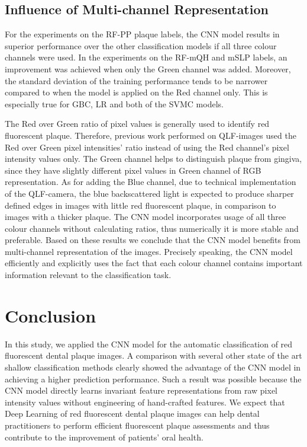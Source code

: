 \documentclass[runningheads,a4paper]{llncs}
\begin{document}
\subsection{Influence of Multi-channel Representation}
For the experiments on the RF-PP plaque labels, the CNN model results in superior performance over the other classification models if all three colour channels were used. In the experiments on the RF-mQH and mSLP labels, an improvement was achieved when only the Green channel was added. Moreover, the standard deviation of the training performance tends to be narrower compared to when the model is applied on the Red channel only. This is especially true for GBC, LR and both of the SVMC models.

The Red over Green ratio of pixel values is generally used to identify red fluorescent plaque. Therefore, previous work performed on QLF-images \cite{lee2013association,kim2014monitoring} used the Red over Green pixel intensities' ratio instead of using the Red channel's pixel intensity values only. The Green channel helps to distinguish plaque from gingiva, since they have slightly different pixel values in Green channel of RGB representation. As for adding the Blue channel, due to technical implementation of the QLF-camera, the blue backscattered light is expected to produce sharper defined edges in images with little red fluorescent plaque, in comparison to images with a thicker plaque. The CNN model incorporates usage of all three colour channels without calculating ratios, thus numerically it is more stable and preferable. Based on these results we conclude that the CNN model benefits from multi-channel representation of the images. Precisely speaking, the CNN model efficiently and explicitly uses the fact that each colour channel contains important information relevant to the classification task.

\section{Conclusion}
In this study, we applied the CNN model for the automatic classification of red fluorescent dental plaque images. A comparison with several other state of the art shallow classification methods clearly showed the advantage of the CNN model in achieving a higher prediction performance. Such a result was possible because the CNN model directly learns invariant feature representations from raw pixel intensity values without engineering of hand-crafted features. We expect that Deep Learning of red fluorescent dental plaque images can help dental practitioners to perform efficient fluorescent plaque assessments and thus contribute to the improvement of patients' oral health.
\end{document}
